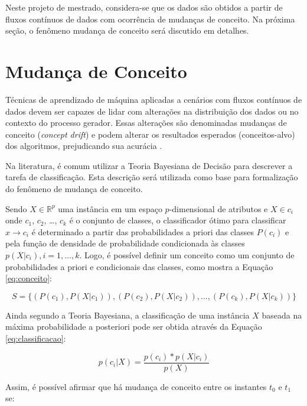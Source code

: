 \documentclass[qual, classic, a4paper]{ufbathesis}
\begin{document}
Neste projeto de mestrado, considera-se que os dados são obtidos a partir de fluxos contínuos de dados com ocorrência de mudanças de conceito.
Na próxima seção, o fenômeno mudança de conceito será discutido em detalhes.

\section{Mudança de Conceito}
\label{sec:mudanca_de_conceito}

Técnicas de aprendizado de máquina aplicadas a cenários com fluxos contínuos de dados devem ser capazes de lidar com alterações na distribuição dos dados ou no contexto do processo gerador.
Essas alterações são denominadas mudanças de conceito (\textit{concept drift}) e podem alterar os resultados esperados (conceitos-alvo) dos algoritmos, prejudicando sua acurácia \cite{Widmer:1996:LPC:226791.226798}.

Na literatura, é comum utilizar a Teoria Bayesiana de Decisão \cite{Duda:2000:PC:954544} para descrever a tarefa de classificação.
Esta descrição será utilizada como base para formalização do fenômeno de mudança de conceito.

Sendo $X \in \mathbb{R}^p$ uma instância em um espaço $p$-dimensional de atributos e $X \in c_i$ onde $c_1$, $c_2$, \ldots, $c_k$ é o conjunto de classes, 
o classificador ótimo para classificar $x \rightarrow c_i$ é determinado a partir das probabilidades a priori das classes $P(c_i)$ e pela função de densidade de probabilidade condicionada às classes $p(X|c_i), i = 1, \ldots, k$.
Logo, é possível definir um conceito como um conjunto de probabilidades a priori e condicionais das classes, como mostra a Equação \ref{eq:conceito}:

\begin{equation} \label{eq:conceito}
    S = \{(P(c_1), P(X|c_1)), (P(c_2), P(X|c_2)), ..., (P(c_k), P(X|c_k))\}
\end{equation}

Ainda segundo a Teoria Bayesiana, a classificação de uma instância $X$ baseada na máxima probabilidade a posteriori pode ser obtida através da Equação \ref{eq:classificacao}:

\begin{equation} \label{eq:classificacao}
    p(c_i|X) = \frac{p(c_i) * p(X|c_i)}{p(X)}
\end{equation}

Assim, é possível afirmar que há mudança de conceito entre os instantes $t_0$ e $t_1$ se:
\end{document}

